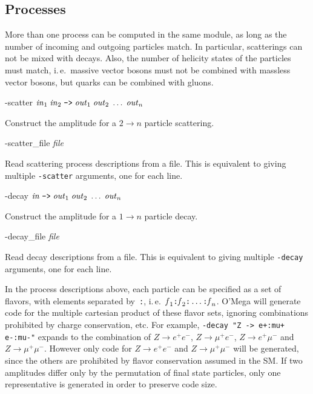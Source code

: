 \documentclass[12pt,a4paper]{article}
\newenvironment{options}%
 {\begin{list}{}%
   {\setlength{\leftmargin}{3em}%
    \setlength{\rightmargin}{3em}%
    \setlength{\itemindent}{1em}%
    \setlength{\listparindent}{0pt}%
    \settowidth{\labelwidth}{5em}%
    \renewcommand{\makelabel}[1]{\texttt{##1}}}}%
 {\end{list}}
\begin{document}
\subsection{Processes}
More than one process can be computed in the same module,
as long as the number of incoming and outgoing particles match.  In
particular, scatterings can not be mixed with decays.  Also, the
number of helicity states of the particles must match, i.\,e.~massive
vector bosons must not be combined with massless vector bosons, but
quarks can be combined with gluons.
\begin{options}
  \item[-scatter] $\text{\textit{in}}_1\;\text{\textit{in}}_2\;\verb+->+\;
      \text{\textit{out}}_1\;\text{\textit{out}}_2\;\ldots\;\text{\textit{out}}_n$\par
     Construct the amplitude for a $2\to n$ particle scattering.
  \item[-scatter\_file] \textit{file}\par
    Read scattering process descriptions from a file.  This is
    equivalent to giving multiple \verb+-scatter+ arguments, one for
    each line.
  \item[-decay] $\text{\textit{in}}\;\verb+->+\;
      \text{\textit{out}}_1\;\text{\textit{out}}_2\;\ldots\;\text{\textit{out}}_n$\par
    Construct the amplitude for a $1\to n$ particle decay.
  \item[-decay\_file] \textit{file}\par
    Read decay descriptions from a file. This is
    equivalent to giving multiple \verb+-decay+ arguments, one for each line. 
\end{options}
In the process descriptions above, each particle can be specified as a
set of flavors, with elements separated by~\verb+:+,
i.\,e.~$\text{\textit{f}}_1\verb+:+\text{\textit{f}}_2\verb+:+\ldots\verb+:+\text{\textit{f}}_n$.
O'Mega will generate code for the multiple cartesian product of these
flavor sets, ignoring combinations prohibited by charge conservation,
etc.  For example, \verb|-decay "Z -> e+:mu+ e-:mu-"| expands to the
combination of $Z \to e^+ e^-$, $Z \to \mu^+ e^-$, $Z \to e^+ \mu^-$
and $Z \to \mu^+ \mu^-$.  However only code for $Z \to e^+ e^-$ and $Z
\to \mu^+ \mu^-$ will be generated, since the others are prohibited by
flavor conservation assumed in the SM.  If two amplitudes differ only by the
permutation of final state particles, only one representative is
generated in order to preserve code size.
\end{document}
